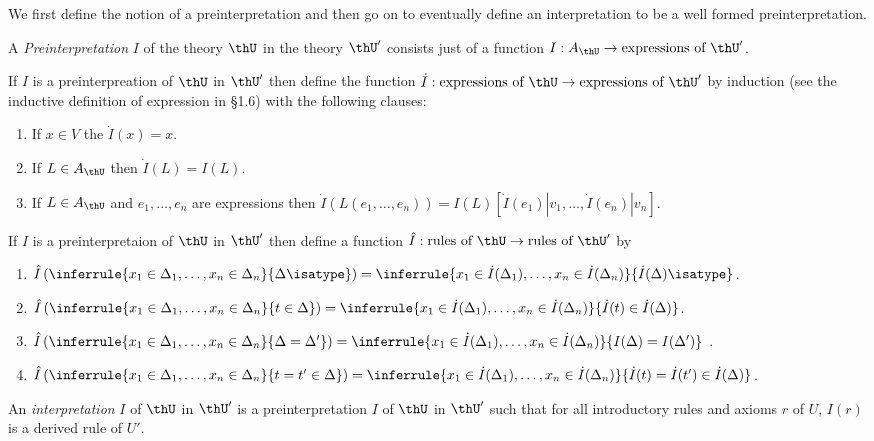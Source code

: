 We first define the notion of a preinterpretation and then go on to eventually define an interpretation to be a well formed preinterpretation.

\begin{definition}
  A \emph{Preinterpretation} $I$ of the theory $\thU$ in the theory $\thU'$ consists just of a function $I:A_{\thU}\to\text{expressions of }\thU'$.

  If $I$ is a preinterpreation of $\thU$ in $\thU'$ then define the function $\dot I : \text{expressions of }\thU\to\text{expressions of }\thU'$ by induction (see the inductive definition of expression in \S 1.6) with the following clauses:
  \begin{enumerate}
    \item If $x\in V$ the $\dot I(x) = x$.
    \item If $L\in A_\thU$ then $\dot I(L) = I(L)$.
    \item If $L\in A_\thU$ and $e_1,\ldots,e_n$ are expressions then $\dot I(L(e_1,\ldots,e_n))=I(L)[\dot I(e_1) | v_1,\ldots,\dot I(e_n)|v_n]$.
  \end{enumerate}

  If $I$ is a preinterpretaion of $\thU$ in $\thU'$ then define a function $\hat I: \text{rules of }\thU\to\text{rules of }\thU'$ by

  \begin{enumerate}
    \item $\hat I\left(\inferrule{x_1\in\Delta_1,\ldots,x_n\in\Delta_n}{\Delta\isatype}\right) = \inferrule{x_1\in\dot I(\Delta_1),\ldots,x_n\in\dot I(\Delta_n)}{\dot I(\Delta)\isatype}$.

    \item $\hat I\left(\inferrule{x_1\in\Delta_1,\ldots,x_n\in\Delta_n}{t\in\Delta}\right) = \inferrule{x_1\in\dot I(\Delta_1),\ldots,x_n\in\dot I(\Delta_n)}{\dot I(t)\in\dot I(\Delta)}$.

    \item $\hat I\left(\inferrule{x_1\in\Delta_1,\ldots,x_n\in\Delta_n}{\Delta=\Delta'}\right) = \inferrule{x_1\in\dot I(\Delta_1),\ldots,x_n\in\dot I(\Delta_n)}{I(\Delta)=I(\Delta')}$ .

    \item $\hat I\left(\inferrule{x_1\in\Delta_1,\ldots,x_n\in\Delta_n}{t=t'\in\Delta}\right) = \inferrule{x_1\in\dot I(\Delta_1),\ldots,x_n\in\dot I(\Delta_n)}{\dot I(t) = \dot I(t')\in\dot I(\Delta)}$.
  \end{enumerate}

  An \emph{interpretation} $I$ of $\thU$ in $\thU'$ is a preinterpretation $I$ of $\thU$ in $\thU'$ such that for all introductory rules and axioms $r$ of $U$, $I(r)$ is a derived rule of $U'$.

\end{definition}

